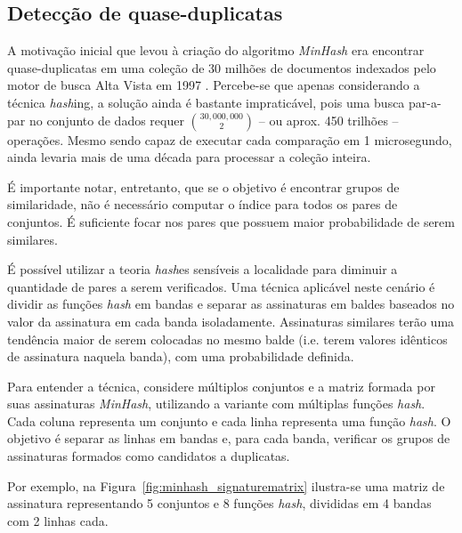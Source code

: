 \subsection{Detecção de quase-duplicatas}\label{sec:min:duplicate}

A motivação inicial que levou à criação do algoritmo \emph{MinHash} era encontrar quase-duplicatas em uma coleção de 30 milhões de documentos indexados pelo motor de busca Alta Vista em 1997 \cite{broder1997resemblance}. Percebe-se que apenas considerando a técnica \emph{hash}ing, a solução ainda é bastante impraticável, pois uma busca par-a-par no conjunto de dados requer $\binom{30,000,000}{2}$ -- ou aprox. 450 trilhões -- operações. Mesmo sendo capaz de executar cada comparação em 1 microsegundo, ainda levaria mais de uma década para processar a coleção inteira.

É importante notar, entretanto, que se o objetivo é encontrar grupos de similaridade, não é necessário computar o índice para todos os pares de conjuntos. É suficiente focar nos pares que possuem maior probabilidade de serem similares.

É possível utilizar a teoria \emph{hash}es sensíveis a localidade para diminuir a quantidade de pares a serem verificados. Uma técnica aplicável neste cenário é dividir as funções \emph{hash} em bandas e separar as assinaturas em baldes baseados no valor da assinatura em cada banda isoladamente. Assinaturas similares terão uma tendência maior de serem colocadas no mesmo balde (i.e. terem valores idênticos de assinatura naquela banda), com uma probabilidade definida.

Para entender a técnica, considere múltiplos conjuntos e a matriz formada por suas assinaturas \emph{MinHash}, utilizando a variante com múltiplas funções \emph{hash}. Cada coluna representa um conjunto e cada linha representa uma função \emph{hash}. O objetivo é separar as linhas em bandas e, para cada banda, verificar os grupos de assinaturas formados como candidatos a duplicatas. 

Por exemplo, na Figura~\ref{fig:minhash_signaturematrix} ilustra-se uma matriz de assinatura representando 5 conjuntos e 8 funções \emph{hash}, divididas em 4 bandas com 2 linhas cada.

